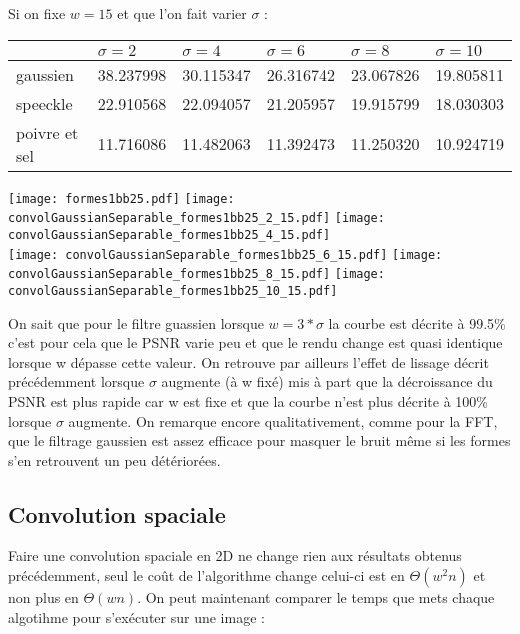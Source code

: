 \documentclass[12pt]{article}
\numberwithin{equation}{section}
\begin{document}
Si on fixe $w = 15$ et que l'on fait varier $\sigma$ :
\begin{center}
  \begin{tabular}{|l|l|l|l|l|l|}
    \hline
    & $\sigma = 2$ & $\sigma = 4$ & $\sigma = 6$  & $\sigma = 8$ & $\sigma = 10$ \\
    \hline
    gaussien & 38.237998  & 30.115347  & 26.316742 & 23.067826  & 19.805811\\
    \hline
    speeckle & 22.910568  & 22.094057 & 21.205957  &19.915799 & 18.030303 \\
    \hline
    poivre et sel & 11.716086  & 11.482063 & 11.392473  &  11.250320 & 10.924719\\
    \hline
  \end{tabular}
\end{center}

\begin{center}
\texttt{[image: formes1bb25.pdf]}
\texttt{[image: convolGaussianSeparable\_formes1bb25\_2\_15.pdf]}
\texttt{[image: convolGaussianSeparable\_formes1bb25\_4\_15.pdf]}\\
\texttt{[image: convolGaussianSeparable\_formes1bb25\_6\_15.pdf]}
\texttt{[image: convolGaussianSeparable\_formes1bb25\_8\_15.pdf]}
\texttt{[image: convolGaussianSeparable\_formes1bb25\_10\_15.pdf]}\\
\end{center}

On sait que pour le filtre guassien lorsque $w = 3*\sigma$ la courbe est décrite à 99.5\% c'est pour cela que le PSNR varie peu et que le rendu change est quasi identique lorsque w dépasse cette valeur. On retrouve par ailleurs l'effet de lissage décrit précédemment lorsque $\sigma$ augmente (à w fixé) mis à part que la décroissance du PSNR est plus rapide car w est fixe et que la courbe n'est plus décrite à 100\% lorsque $\sigma$ augmente. On remarque encore qualitativement, comme pour la FFT, que le filtrage gaussien est assez efficace pour masquer le bruit même si les formes s'en retrouvent un peu détériorées.
\subsection{Convolution spaciale}
Faire une convolution spaciale en 2D ne change rien aux résultats obtenus précédemment, seul le coût de l'algorithme change celui-ci est en $\Theta(w^2n)$ et non plus en $\Theta(wn)$. On peut maintenant comparer le temps que mets chaque algotihme pour s'exécuter sur une image :
\end{document}
